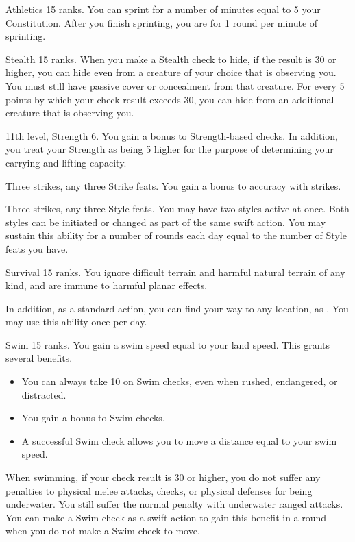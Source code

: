 \featpre Athletics 15 ranks.
\featben You can sprint for a number of minutes equal to 5 \add your Constitution.
After you finish sprinting, you are \fatigued for 1 round per minute of sprinting.

\featpre Stealth 15 ranks.
\featben When you make a Stealth check to hide, if the result is 30 or higher, you can hide even from a creature of your choice that is observing you.
You must still have passive cover or concealment from that creature.
For every 5 points by which your check result exceeds 30, you can hide from an additional creature that is observing you.

\featpres 11th level, Strength 6.
\featben You gain a  bonus to Strength-based checks.
In addition, you treat your Strength as being 5 higher for the purpose of determining your carrying and lifting capacity.

\featpres Three strikes, any three Strike feats.
\featben You gain a  bonus to accuracy with strikes.

\featpres Three strikes, any three Style feats.
\featben You may have two styles active at once.
Both styles can be initiated or changed as part of the same swift action.
You may sustain this ability for a number of rounds each day equal to the number of Style feats you have.

\featpre Survival 15 ranks.
\featben You ignore difficult terrain and harmful natural terrain of any kind, and are immune to harmful planar effects.

In addition, as a standard action, you can find your way to any location, as .
You may use this ability once per day.

\featpre Swim 15 ranks.
\featben You gain a swim speed equal to your land speed.
This grants several benefits.
\begin{itemize}
    \item You can always take 10 on Swim checks, even when rushed, endangered, or distracted.
    \item You gain a  bonus to Swim checks.
    \item A successful Swim check allows you to move a distance equal to your swim speed.
\end{itemize}

When swimming, if your check result is 30 or higher, you do not suffer any penalties to physical melee attacks, checks, or physical defenses for being underwater.
You still suffer the normal penalty with underwater ranged attacks.
You can make a Swim check as a swift action to gain this benefit in a round when you do not make a Swim check to move.


